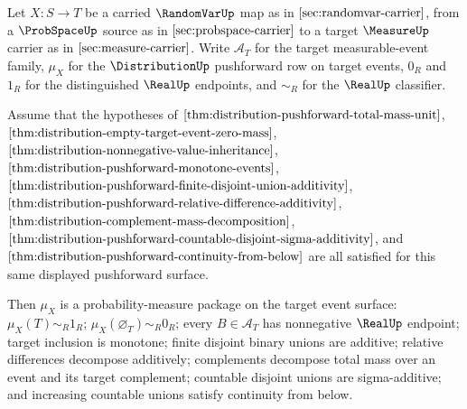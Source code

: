 \begin{theorem}\label{thm:distribution-pushforward-borel-probability-package}
Let $X:S\to T$ be a carried $\RandomVarUp$ map as in $\autoref{sec:randomvar-carrier}$, from a $\ProbSpaceUp$ source as in $\autoref{sec:probspace-carrier}$ to a target $\MeasureUp$ carrier as in $\autoref{sec:measure-carrier}$. Write $\mathcal A_T$ for the target measurable-event family, $\mu_X$ for the $\DistributionUp$ pushforward row on target events, $0_R$ and $1_R$ for the distinguished $\RealUp$ endpoints, and $\sim_R$ for the $\RealUp$ classifier.

Assume that the hypotheses of $\autoref{thm:distribution-pushforward-total-mass-unit}$, $\autoref{thm:distribution-empty-target-event-zero-mass}$, $\autoref{thm:distribution-nonnegative-value-inheritance}$, $\autoref{thm:distribution-pushforward-monotone-events}$, $\autoref{thm:distribution-pushforward-finite-disjoint-union-additivity}$, $\autoref{thm:distribution-pushforward-relative-difference-additivity}$, $\autoref{thm:distribution-complement-mass-decomposition}$, $\autoref{thm:distribution-pushforward-countable-disjoint-sigma-additivity}$, and $\autoref{thm:distribution-pushforward-continuity-from-below}$ are all satisfied for this same displayed pushforward surface.

Then $\mu_X$ is a probability-measure package on the target event surface: $\mu_X(T)\sim_R 1_R$; $\mu_X(\varnothing_T)\sim_R 0_R$; every $B\in\mathcal A_T$ has nonnegative $\RealUp$ endpoint; target inclusion is monotone; finite disjoint binary unions are additive; relative differences decompose additively; complements decompose total mass over an event and its target complement; countable disjoint unions are sigma-additive; and increasing countable unions satisfy continuity from below.
\end{theorem}
